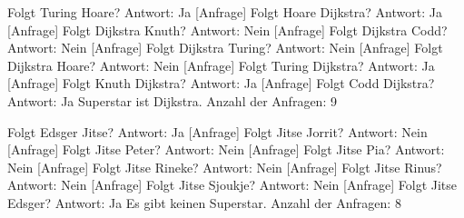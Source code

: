\documentclass[a4paper, notitlepage, 12pt]{scrartcl}
\begin{document}

  \begin{MyVerbatim}
[Anfrage] Folgt Turing Hoare? Antwort: Ja
[Anfrage] Folgt Hoare Dijkstra? Antwort: Ja
[Anfrage] Folgt Dijkstra Knuth? Antwort: Nein
[Anfrage] Folgt Dijkstra Codd? Antwort: Nein
[Anfrage] Folgt Dijkstra Turing? Antwort: Nein
[Anfrage] Folgt Dijkstra Hoare? Antwort: Nein
[Anfrage] Folgt Turing Dijkstra? Antwort: Ja
[Anfrage] Folgt Knuth Dijkstra? Antwort: Ja
[Anfrage] Folgt Codd Dijkstra? Antwort: Ja
Superstar ist Dijkstra.
Anzahl der Anfragen: 9
  \end{MyVerbatim}


  \begin{MyVerbatim}
[Anfrage] Folgt Edsger Jitse? Antwort: Ja
[Anfrage] Folgt Jitse Jorrit? Antwort: Nein
[Anfrage] Folgt Jitse Peter? Antwort: Nein
[Anfrage] Folgt Jitse Pia? Antwort: Nein
[Anfrage] Folgt Jitse Rineke? Antwort: Nein
[Anfrage] Folgt Jitse Rinus? Antwort: Nein
[Anfrage] Folgt Jitse Sjoukje? Antwort: Nein
[Anfrage] Folgt Jitse Edsger? Antwort: Ja
Es gibt keinen Superstar.
Anzahl der Anfragen: 8
  \end{MyVerbatim}

\end{document}
